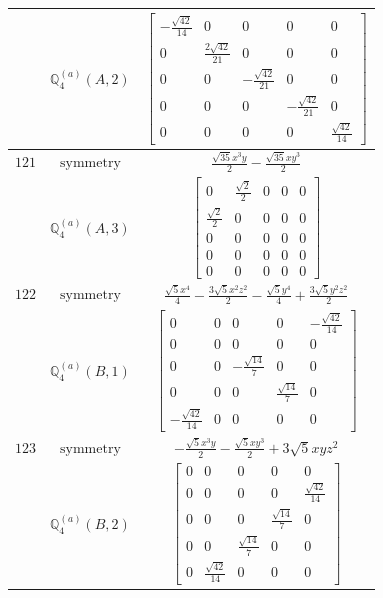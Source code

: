 \documentclass[fleqn,8pt,landscape]{jsarticle}
\begin{document}
\begin{longtable}{ccc}
$  $ & $ \mathbb{Q}_{4}^{(a)}(A,2) $ & $ \begin{bmatrix} - \frac{\sqrt{42}}{14} & 0 & 0 & 0 & 0 \\ 0 & \frac{2 \sqrt{42}}{21} & 0 & 0 & 0 \\ 0 & 0 & - \frac{\sqrt{42}}{21} & 0 & 0 \\ 0 & 0 & 0 & - \frac{\sqrt{42}}{21} & 0 \\ 0 & 0 & 0 & 0 & \frac{\sqrt{42}}{14} \end{bmatrix} $ \\ \hline
$ 121 $ & $ \text{symmetry} $ & $ \frac{\sqrt{35} x^{3} y}{2} - \frac{\sqrt{35} x y^{3}}{2} $ \\
$  $ & $ \mathbb{Q}_{4}^{(a)}(A,3) $ & $ \begin{bmatrix} 0 & \frac{\sqrt{2}}{2} & 0 & 0 & 0 \\ \frac{\sqrt{2}}{2} & 0 & 0 & 0 & 0 \\ 0 & 0 & 0 & 0 & 0 \\ 0 & 0 & 0 & 0 & 0 \\ 0 & 0 & 0 & 0 & 0 \end{bmatrix} $ \\ \hline
$ 122 $ & $ \text{symmetry} $ & $ \frac{\sqrt{5} x^{4}}{4} - \frac{3 \sqrt{5} x^{2} z^{2}}{2} - \frac{\sqrt{5} y^{4}}{4} + \frac{3 \sqrt{5} y^{2} z^{2}}{2} $ \\
$  $ & $ \mathbb{Q}_{4}^{(a)}(B,1) $ & $ \begin{bmatrix} 0 & 0 & 0 & 0 & - \frac{\sqrt{42}}{14} \\ 0 & 0 & 0 & 0 & 0 \\ 0 & 0 & - \frac{\sqrt{14}}{7} & 0 & 0 \\ 0 & 0 & 0 & \frac{\sqrt{14}}{7} & 0 \\ - \frac{\sqrt{42}}{14} & 0 & 0 & 0 & 0 \end{bmatrix} $ \\ \hline
$ 123 $ & $ \text{symmetry} $ & $ - \frac{\sqrt{5} x^{3} y}{2} - \frac{\sqrt{5} x y^{3}}{2} + 3 \sqrt{5} x y z^{2} $ \\
$  $ & $ \mathbb{Q}_{4}^{(a)}(B,2) $ & $ \begin{bmatrix} 0 & 0 & 0 & 0 & 0 \\ 0 & 0 & 0 & 0 & \frac{\sqrt{42}}{14} \\ 0 & 0 & 0 & \frac{\sqrt{14}}{7} & 0 \\ 0 & 0 & \frac{\sqrt{14}}{7} & 0 & 0 \\ 0 & \frac{\sqrt{42}}{14} & 0 & 0 & 0 \end{bmatrix} $ \\ \hline

\end{longtable}
\end{document}
